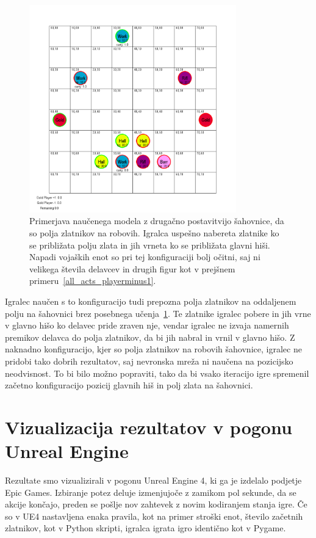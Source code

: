 \documentclass[a4paper, 12pt]{book}
\begin{document}
\begin{figure}[h!]
	\begin{center}
		\includegraphics[width=0.8\textwidth]{photos/pit_minerals_apart_100.pdf}
	\end{center}
	\caption{Primerjava naučenega modela z drugačno postavitvijo šahovnice, da so polja zlatnikov na robovih.
		Igralca uspešno nabereta zlatnike ko se približata polju zlata in jih vrneta ko se približata glavni hiši.
		Napadi vojaških enot so pri tej konfiguraciji bolj očitni, saj ni velikega števila delavcev in drugih figur kot v prejšnem primeru~\ref{all_acts_playerminus1}.}
	\label{pit_minerals_apart_100}
\end{figure}

Igralec naučen s to konfiguracijo tudi prepozna polja zlatnikov na oddaljenem polju na šahovnici brez posebnega učenja~\ref{pit_minerals_apart_100}.
Te zlatnike igralec pobere in jih vrne v glavno hišo ko delavec pride zraven nje, vendar igralec ne izvaja namernih premikov delavca do polja zlatnikov, da bi jih nabral in vrnil v glavno hišo.
Z naknadno konfiguracijo, kjer so polja zlatnikov na robovih šahovnice, igralec ne pridobi tako dobrih rezultatov, saj nevronska mreža ni naučena na pozicijsko neodvisnost.
To bi bilo možno popraviti, tako da bi vsako iteracijo igre spremenil začetno konfiguracijo pozicij glavnih hiš in polj zlata na šahovnici.


\section{Vizualizacija rezultatov v pogonu Unreal Engine}
Rezultate smo vizualizirali v pogonu Unreal Engine 4, ki ga je izdelalo podjetje Epic Games.
Izbiranje potez deluje izmenjujoče z zamikom pol sekunde, da se akcije končajo, preden se pošlje nov zahtevek z novim kodiranjem stanja igre.
Če so v UE4 nastavljena enaka pravila, kot na primer stroški enot, število začetnih zlatnikov, kot v Python skripti, igralca igrata igro identično kot v Pygame.
\end{document}
